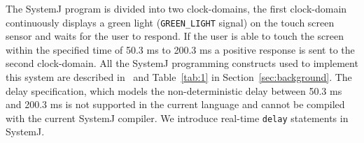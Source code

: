 The SystemJ program is divided into two clock-domains, the first
clock-domain continuously displays a green light (\texttt{GREEN\_LIGHT}
signal) on the touch screen sensor and waits for the user to respond. If
the user is able to touch the screen within the specified time of 50.3
ms to 200.3 ms a positive response is sent to the second
clock-domain. All the SystemJ programming constructs used to implement
this system are described in~\cite{amal10} and Table~\ref{tab:1} in
Section~\ref{sec:background}. The delay speciﬁcation, which models the
non-deterministic delay between 50.3 ms and 200.3 ms is not supported in
the current language and cannot be compiled with the current SystemJ
compiler. We introduce real-time \texttt{delay} statements in SystemJ.

